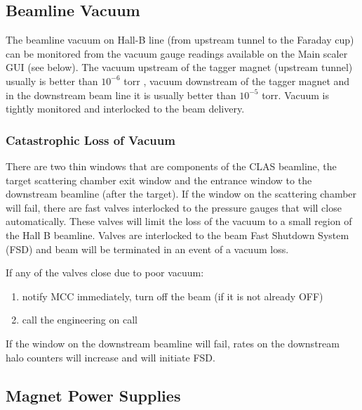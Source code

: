 \documentclass[12pt]{article}
\begin{document}
\subsection{Beamline Vacuum}
\indent

The beamline vacuum on Hall-B line (from upstream tunnel to the Faraday cup) can be monitored from the vacuum gauge readings available on the Main scaler GUI (see below). The vacuum upstream of the tagger magnet (upstream tunnel) usually is better than \( 10^{-6} \) torr , vacuum  downstream of the tagger magnet and in the downstream beam line it is usually better than \( 10^{-5} \) torr. Vacuum is tightly monitored and interlocked to the beam delivery. 


\subsubsection{Catastrophic Loss of Vacuum}
\indent

There are two thin windows that are components of the CLAS beamline, the target scattering chamber exit window
and the entrance window to the downstream beamline (after the target). If the window on the scattering chamber will fail, there are fast valves interlocked to the pressure gauges that will close automatically. These valves will limit the loss of the vacuum to a small region of the Hall B beamline. Valves are interlocked to the beam Fast Shutdown System (FSD) and beam will be terminated in an event of a vacuum loss.

If any of the valves close due to poor vacuum: 

\begin{enumerate}
\item notify MCC immediately, turn off the beam (if it is not already OFF)
\item call the engineering on call 
\end{enumerate}

If the window on the downstream beamline will fail, rates on the downstream halo counters will increase and will initiate FSD. 

\subsection{Magnet Power Supplies}
\indent
\end{document}
